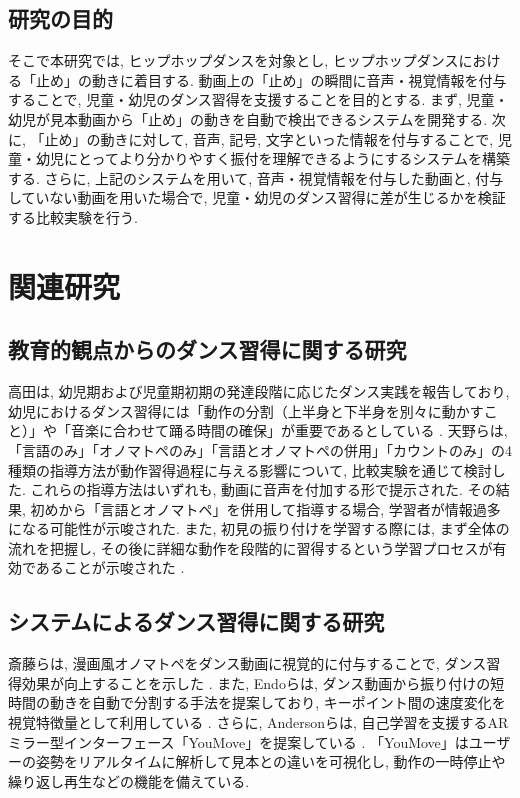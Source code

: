 \documentclass[paper]{ieicej}
\begin{document}
\subsection{研究の目的}
そこで本研究では, ヒップホップダンスを対象とし, ヒップホップダンスにおける「止め」の動きに着目する. 動画上の「止め」の瞬間に音声・視覚情報を付与することで, 児童・幼児のダンス習得を支援することを目的とする. まず, 児童・幼児が見本動画から「止め」の動きを自動で検出できるシステムを開発する. 次に, 「止め」の動きに対して, 音声, 記号, 文字といった情報を付与することで, 児童・幼児にとってより分かりやすく振付を理解できるようにするシステムを構築する. さらに, 上記のシステムを用いて, 音声・視覚情報を付与した動画と, 付与していない動画を用いた場合で, 児童・幼児のダンス習得に差が生じるかを検証する比較実験を行う. 
\section{関連研究}
\subsection{教育的観点からのダンス習得に関する研究}
高田は, 幼児期および児童期初期の発達段階に応じたダンス実践を報告しており, 幼児におけるダンス習得には「動作の分割（上半身と下半身を別々に動かすこと）」や「音楽に合わせて踊る時間の確保」が重要であるとしている \cite{ref13}. 天野らは, 「言語のみ」「オノマトペのみ」「言語とオノマトペの併用」「カウントのみ」の4種類の指導方法が動作習得過程に与える影響について, 比較実験を通じて検討した. これらの指導方法はいずれも, 動画に音声を付加する形で提示された. その結果, 初めから「言語とオノマトペ」を併用して指導する場合, 学習者が情報過多になる可能性が示唆された. また, 初見の振り付けを学習する際には, まず全体の流れを把握し, その後に詳細な動作を段階的に習得するという学習プロセスが有効であることが示唆された \cite{ref14}. 
\subsection{システムによるダンス習得に関する研究}
斎藤らは, 漫画風オノマトペをダンス動画に視覚的に付与することで, ダンス習得効果が向上することを示した \cite{ref15}. また, Endoらは, ダンス動画から振り付けの短時間の動きを自動で分割する手法を提案しており, キーポイント間の速度変化を視覚特徴量として利用している \cite{ref16}. さらに, Andersonらは, 自己学習を支援するARミラー型インターフェース「YouMove」を提案している \cite{ref22}. 「YouMove」はユーザーの姿勢をリアルタイムに解析して見本との違いを可視化し, 動作の一時停止や繰り返し再生などの機能を備えている. 
\end{document}
